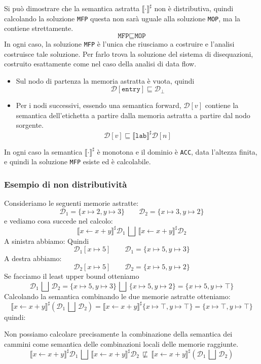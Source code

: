 Si può dimostrare che la semantica astratta $\llbracket \cdot \rrbracket^\sharp$ non 
è distributiva, quindi calcolando la soluzione \texttt{MFP} questa non sarà uguale 
alla soluzione \texttt{MOP}, ma la contiene strettamente.
\[
  \texttt{MFP} \sqsubseteq \texttt{MOP}  
\]
In ogni caso, la soluzione \texttt{MFP} è l'unica che riusciamo a costruire e l'analisi 
costruisce tale soluzione. 
Per farlo trova la soluzione del sistema di disequazioni, costruito esattamente come nel 
caso della analisi di data flow.
\begin{itemize}
    \item Sul nodo di partenza la memoria astratta è vuota, quindi
    \[
        \mathcal{D}[\texttt{entry}] \sqsubseteq \mathcal{D}_\bot 
    \]
    \item Per i nodi successivi, essendo una semantica forward, $\mathcal{D}[v]$ contiene 
    la semantica dell'etichetta a partire dalla memoria astratta a 
    partire dal nodo sorgente.
    \[
        \mathcal{D}[v] \sqsubseteq \llbracket \texttt{lab} \rrbracket^\sharp \mathcal{D}[n]
    \]
\end{itemize}
In ogni caso la semantica $\llbracket \cdot \rrbracket^\sharp$ è monotona e il 
dominio è \texttt{ACC}, data l'altezza finita, e quindi la soluzione \texttt{MFP} 
esiste ed è calcolabile.
\subsubsection{Esempio di non distributività}
Consideriamo le seguenti memorie astratte:
\[
    \mathcal{D}_1 = \{ x \mapsto 2, y \mapsto 3 \} \qquad
    \mathcal{D}_2 = \{ x \mapsto 3, y \mapsto 2 \}
\]
e vediamo cosa succede nel calcolo:
\[
    \llbracket x \gets x + y \rrbracket^\sharp \mathcal{D}_1 
    \,\bigsqcup\, 
    \llbracket x \gets x + y \rrbracket^\sharp \mathcal{D}_2
\]
A sinistra abbiamo:
Quindi 
\[
    \mathcal{D}_1 [x \mapsto 5] \qquad \mathcal{D}_1 = \{ x \mapsto 5, y \mapsto 3 \}
\]
A destra abbiamo:
\[
    \mathcal{D}_2 [x \mapsto 5] \qquad \mathcal{D}_2 = \{ x \mapsto 5, y \mapsto 2 \}
\]
Se facciamo il least upper bound otteniamo 
\[
    \mathcal{D}_1 \,\bigsqcup\, \mathcal{D}_2 = 
    \{ x \mapsto 5, y \mapsto 3 \} \,\bigsqcup\, \{ x \mapsto 5, y \mapsto 2 \} = 
    \{ x \mapsto 5, y \mapsto \top \}
\]
Calcolando la semantica combinando le due memorie astratte otteniamo:
\[
    \llbracket x \gets x + y \rrbracket^\sharp (\mathcal{D}_1 \,\bigsqcup\, \mathcal{D}_2) = 
    \llbracket x \gets x + y \rrbracket^\sharp \{ x \mapsto \top, y \mapsto \top \} =
    \{ x \mapsto \top, y \mapsto \top \}
\]
quindi:
\begin{tcolorbox}[title = Non distributività della semantica]
    Non possiamo calcolare precisamente la combinazione della semantica dei cammini
    come semantica delle combinazioni locali delle memorie raggiunte.
    \[
        \llbracket x \gets x + y \rrbracket^\sharp \mathcal{D}_1
        \,\bigsqcup\,
        \llbracket x \gets x + y \rrbracket^\sharp \mathcal{D}_2
        \,\not \sqsubseteq\,
        \llbracket x \gets x + y \rrbracket^\sharp (\mathcal{D}_1 \,\bigsqcup\, \mathcal{D}_2)
    \]
\end{tcolorbox}
